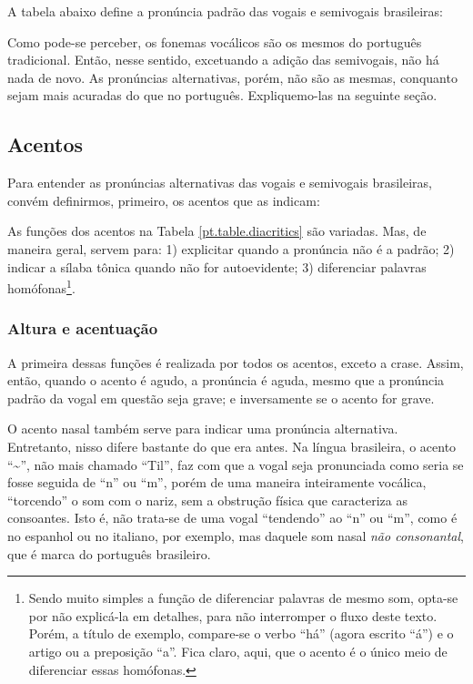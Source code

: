 \documentclass[12pt, a5paper, titlepage]{article}
\begin{document}
\begin{bilingualpages}
    A tabela abaixo define a pronúncia padrão das vogais e semivogais brasileiras:

    \PtTableVowels

    Como pode-se perceber, os fonemas vocálicos são os mesmos do português
    tradicional. Então, nesse sentido, excetuando a adição das semivogais, não há
    nada de novo. As pronúncias alternativas, porém, não são as mesmas, conquanto
    sejam mais acuradas do que no português. Expliquemo-las na seguinte seção.

    \subsection{Acentos}
    Para entender as pronúncias alternativas das vogais e semivogais brasileiras,
    convém definirmos, primeiro, os acentos que as indicam:

    \PtTableDiacritics

    As funções dos acentos na Tabela \ref{pt.table.diacritics} são variadas. Mas,
    de maneira geral, servem para: 1) explicitar quando a pronúncia não é a padrão;
    2) indicar a sílaba tônica quando não for autoevidente; 3) diferenciar palavras
    homófonas\footnote{Sendo muito simples a função de diferenciar palavras de mesmo som, opta-se por não explicá-la em detalhes, para não interromper o fluxo deste texto. Porém, a título de exemplo, compare-se o verbo ``há'' (agora escrito ``á'') e o artigo ou a preposição ``a''. Fica claro, aqui, que o acento é o único meio de diferenciar essas homófonas.}.

    \subsubsection{Altura e acentuação}
    A primeira dessas funções é realizada por todos os acentos, exceto a crase.
    Assim, então, quando o acento é agudo, a pronúncia é aguda, mesmo que a
    pronúncia padrão da vogal em questão seja grave; e inversamente se o acento for
    grave.

    O acento nasal também serve para indicar uma pronúncia alternativa. Entretanto,
    nisso difere bastante do que era antes. Na língua brasileira, o acento
    ``\textasciitilde'', não mais chamado ``Til'', faz com que a vogal seja
    pronunciada como seria se fosse seguida de ``n'' ou ``m'', porém de uma maneira
    inteiramente vocálica, ``torcendo'' o som com o nariz, sem a obstrução física
    que caracteriza as consoantes. Isto é, não trata-se de uma vogal ``tendendo''
    ao ``n'' ou ``m'', como é no espanhol ou no italiano, por exemplo, mas daquele
    som nasal \textit{não consonantal}, que é marca do português brasileiro.


\end{bilingualpages}
\end{document}
